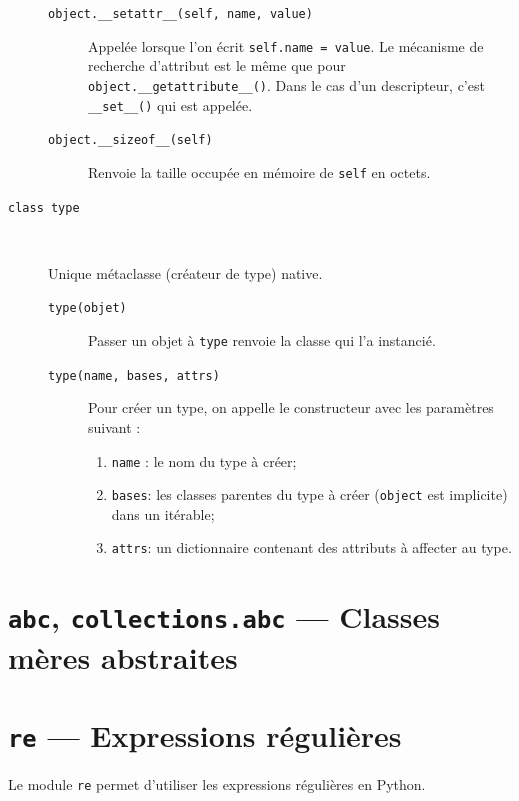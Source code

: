 \documentclass[a4paper, 10pt]{article}
\begin{document}
\begin{description}
\begin{description}
        \item[\texttt{object.__setattr__(self, name, value)}] Appelée lorsque l'on écrit \texttt{self.name = value}. Le mécanisme de recherche d'attribut est le même que pour \texttt{object.__getattribute__()}. Dans le cas d'un descripteur, c'est \texttt{__set__()} qui est appelée.
        \item[\texttt{object.__sizeof__(self)}] Renvoie la taille occupée en mémoire de \texttt{self} en octets. 
    \end{description}

    \item[\texttt{class type}]~
    
    Unique métaclasse (créateur de type) native.
    
    \begin{description}
        \item[\texttt{type(objet)}] Passer un objet à \texttt{type} renvoie la classe qui l'a instancié.
        \item[\texttt{type(name, bases, attrs)}] Pour créer un type, on appelle le constructeur avec les paramètres suivant :
        \begin{enumerate}
            \item \texttt{name} : le nom du type à créer;
            \item \texttt{bases}: les classes parentes du type à créer (\texttt{object} est implicite) dans un itérable;
            \item \texttt{attrs}: un dictionnaire contenant des attributs à affecter au type.
        \end{enumerate}
    \end{description}
\end{description}


\section[{\footnotesize\texttt{abc}}, {\footnotesize\texttt{collections.abc}} --- Classes mères abstraites]{{\normalfont\bfseries\large\texttt{abc}}, {\normalfont\bfseries\large\texttt{collections.abc}} --- Classes mères abstraites}\label{abc}

\section[{\footnotesize\texttt{re}} --- Expressions régulières]{{\normalfont\bfseries\large\texttt{re}} --- Expressions régulières}
Le module \texttt{re}  permet d'utiliser les expressions régulières en Python.
\end{document}
